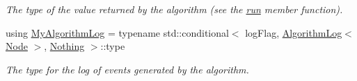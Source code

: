 \begin{DoxyCompactItemize}
\begin{DoxyCompactList}\small\item\em The type of the value returned by the algorithm (see the \hyperlink{structalgorithm_1_1PerGoal_a6aaedb1ac157b0070605e96e577f3535}{run} member function). \end{DoxyCompactList}\item 
using \hyperlink{structalgorithm_1_1PerGoal_aef16fed26bdac27da2059957a1e24650}{My\+Algorithm\+Log} = typename std\+::conditional$<$ log\+Flag, \hyperlink{structAlgorithmLog}{Algorithm\+Log}$<$ \hyperlink{structalgorithm_1_1PerGoal_a6778b78dc81bdd1b8c99b44fb46d3d4a}{Node} $>$, \hyperlink{structNothing}{Nothing} $>$\+::type\hypertarget{structalgorithm_1_1PerGoal_aef16fed26bdac27da2059957a1e24650}{}\label{structalgorithm_1_1PerGoal_aef16fed26bdac27da2059957a1e24650}

\begin{DoxyCompactList}\small\item\em The type for the log of events generated by the algorithm. \end{DoxyCompactList}\end{DoxyCompactItemize}
